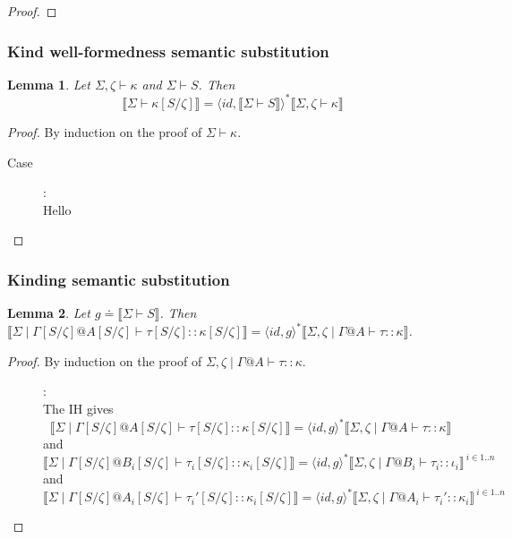 \documentclass{article}
\newtheorem{lemma}{Lemma}
\newcommand{\sem}[1]{\llbracket #1 \rrbracket}
\begin{document}
\begin{proof}

\end{proof}

\subsubsection*{Kind well-formedness semantic substitution}

\begin{lemma}
Let $\Sigma,\zeta \vdash \kappa$ and $\Sigma \vdash S$. Then $$\sem{\Sigma \vdash \kappa[S/\zeta]} = \langle \mathit{id}, \sem{\Sigma \vdash S} \rangle^* \sem{\Sigma,\zeta \vdash \kappa}$$
\end{lemma}

\begin{proof}
By induction on the proof of $\Sigma \vdash \kappa$.
\begin{description}
\item[Case \begin{sc}KWF-Str\end{sc}]:~\\
Hello
\end{description}
\end{proof}

\subsubsection*{Kinding semantic substitution}

\begin{lemma}
Let $g \doteq \sem{\Sigma \vdash S}$. Then $\sem{\Sigma \mid \Gamma[S/\zeta] @ A[S/\zeta] \vdash \tau[S/\zeta] :: \kappa[S/\zeta]} = \langle \mathit{id}, g \rangle^* \sem{\Sigma,\zeta \mid \Gamma @ A \vdash \tau :: \kappa}$. 
\end{lemma}

\begin{proof}
By induction on the proof of $\Sigma,\zeta \mid \Gamma @ A \vdash \tau :: \kappa$.

\begin{description}
\item[]:~\\
The IH gives $$\sem{\Sigma \mid \Gamma[S/\zeta] @ A[S/\zeta] \vdash \tau[S/\zeta] :: \kappa[S/\zeta]} = \langle \mathit{id}, g \rangle^* \sem{\Sigma,\zeta \mid \Gamma @ A \vdash \tau :: \kappa}$$ and $$\sem{\Sigma \mid \Gamma[S/\zeta] @ B_i[S/\zeta] \vdash \tau_i[S/\zeta] :: \kappa_i[S/\zeta]} = \langle \mathit{id}, g \rangle^* \sem{\Sigma,\zeta \mid \Gamma @ B_i \vdash \tau_i :: \iota_i}^{~i \in 1..n}$$ and $$\sem{\Sigma \mid \Gamma[S/\zeta] @ A_i[S/\zeta] \vdash \tau_i'[S/\zeta] :: \kappa_i[S/\zeta]} = \langle \mathit{id}, g \rangle^* \sem{\Sigma,\zeta \mid \Gamma @ A_i \vdash \tau_i' :: \kappa_i}^{~i \in 1..n}$$
\end{description}

\end{proof}
\end{document}
